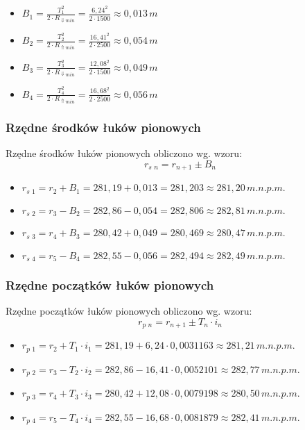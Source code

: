 \documentclass[12pt]{article}
\begin{document}
        \begin{itemize}
            \item \( B_{1} = \frac{T_{1}^{2}}{2 \cdot R_{\Downarrow min}} = \frac{6,24^{2}}{2 \cdot 1500} \approx 0,013\,m \)
            \item \( B_{2} = \frac{T_{2}^{2}}{2 \cdot R_{\Uparrow min}} = \frac{16,41^{2}}{2 \cdot 2500} \approx 0,054\,m \)
            \item \( B_{3} = \frac{T_{3}^{2}}{2 \cdot R_{\Downarrow min}} = \frac{12,08^{2}}{2 \cdot 1500} \approx 0,049\,m \)
            \item \( B_{4} = \frac{T_{4}^{2}}{2 \cdot R_{\Uparrow min}} = \frac{16,68^{2}}{2 \cdot 2500} \approx 0,056\,m \)
        \end{itemize}
    
    \subsubsection{Rzędne środków łuków pionowych}
        Rzędne środków łuków pionowych obliczono wg. wzoru:
        \begin{equation}
            r_{s\,\,n} = r_{n + 1} \pm B_{n}
        \end{equation}

        \begin{itemize}
            \item \( r_{s\,\,1} = r_{2} + B_{1} = 281,19 + 0,013 = 281,203 \approx 281,20\,m.n.p.m. \)
            \item \( r_{s\,\,2} = r_{3} - B_{2} = 282,86 - 0,054 = 282,806 \approx 282,81\,m.n.p.m. \)
            \item \( r_{s\,\,3} = r_{4} + B_{3} = 280,42 + 0,049 = 280,469 \approx 280,47\,m.n.p.m. \)
            \item \( r_{s\,\,4} = r_{5} - B_{4} = 282,55 - 0,056 = 282,494 \approx 282,49\,m.n.p.m. \)
        \end{itemize}
    \subsubsection{Rzędne początków łuków pionowych}
        Rzędne początków łuków pionowych obliczono wg. wzoru:
        \begin{equation}
            r_{p\,\,n} = r_{n+1} \pm T_{n} \cdot i_{n}
        \end{equation}
        \begin{itemize}
            \item \( r_{p\,\,1} = r_{2} + T_{1} \cdot i_{1} = 281,19 + 6,24 \cdot 0,0031163 \approx 281,21\,m.n.p.m. \)
            \item \( r_{p\,\,2} = r_{3} - T_{2} \cdot i_{2} = 282,86 - 16,41 \cdot 0,0052101 \approx 282,77\,m.n.p.m. \)
            \item \( r_{p\,\,3} = r_{4} + T_{3} \cdot i_{3} = 280,42 + 12,08 \cdot 0,0079198 \approx 280,50\,m.n.p.m. \)
            \item \( r_{p\,\,4} = r_{5} - T_{4} \cdot i_{4} = 282,55 - 16,68 \cdot 0,0081879 \approx 282,41\,m.n.p.m. \)
        \end{itemize}
\end{document}
